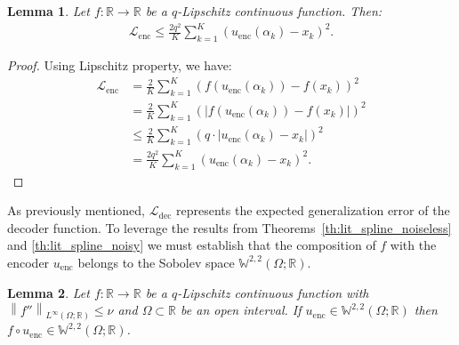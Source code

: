 \documentclass{article}
\newtheorem{lemma}{Lemma}
\def\encs{u_\textrm{enc}}
\def\lenc{\mathcal{L}_\textrm{enc}}
\def\ldec{\mathcal{L}_\textrm{dec}}
\newcommand{\norm}[1]{\left\lVert#1\right\rVert}
\newcommand{\lp}[1]{{L}^{#1}\left(\Omega; \mathbb{R}\right)}
\newcommand{\sob}[2]{\mathbb{W}^{#1,#2}\left(\Omega; \mathbb{R}\right)}
\begin{document}
\begin{lemma}\label{lem:lt}
Let $f:\mathbb{R} \to \mathbb{R}$ be a $q$-Lipschitz continuous function. Then:
\begin{align}
    \lenc \leqslant\frac{2q^2}{K} \sum^K_{k=1} (\encs(\alpha_k) - x_k)^2.
\end{align}
\end{lemma}
\begin{proof}
Using Lipschitz property, we have:
\begin{align}
     \lenc &= \frac{2}{K} \sum^K_{k=1} \left(f(\encs(\alpha_k))- f(x_k)\right)^2 \nonumber \\ 
     &= \frac{2}{K} \sum^K_{k=1} \left(|f(\encs(\alpha_k))- f(x_k)|\right)^2 \nonumber \\ 
     &\leqslant \frac{2}{K} \sum^K_{k=1} \left(q\cdot|\encs(\alpha_k)- x_k|\right)^2 \nonumber \\
     &= \frac{2q^2}{K} \sum^K_{k=1}  (\encs(\alpha_k)- x_k)^2.
\end{align}
\end{proof}
As previously mentioned,  $\ldec$ represents the expected generalization error of the decoder function. To leverage the results from Theorems~\ref{th:lit_spline_noiseless} and \ref{th:lit_spline_noisy} we must establish that the composition of $f$ with the encoder $\encs$ belongs to the Sobolev space $\sob{2}{2}$.
\begin{lemma}\label{lem:fou}
Let $f:\mathbb{R} \to \mathbb{R}$ be a $q$-Lipschitz continuous function with $\norm{f''}_{\lp{\infty}} \leqslant \nu$ and $\Omega \subset \mathbb{R}$ be an open interval. If $\encs \in \sob{2}{2}$ then $f\circ \encs \in \sob{2}{2}$.
\end{lemma}
\end{document}
